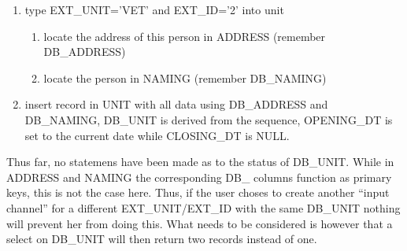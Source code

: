 \begin{enumerate}
\item type EXT\_UNIT='VET' and EXT\_ID='2' into unit

\begin{enumerate}
\item locate the address of this person in ADDRESS (remember DB\_ADDRESS)
\item locate the person in NAMING (remember DB\_NAMING)
\end{enumerate}
\item insert record in UNIT with all data using DB\_ADDRESS and DB\_NAMING,
DB\_UNIT is derived from the sequence, OPENING\_DT is set to the current
date while CLOSING\_DT is NULL.
\end{enumerate}
Thus far, no statemens have been made as to the status of DB\_UNIT.
While in ADDRESS and NAMING the corresponding DB\_ columns function
as primary keys, this is not the case here. Thus, if the user choses
to create another {}``input channel'' for a different EXT\_UNIT/EXT\_ID
with the same DB\_UNIT nothing will prevent her from doing this. What
needs to be considered is however that a select on DB\_UNIT will then
return two records instead of one.
